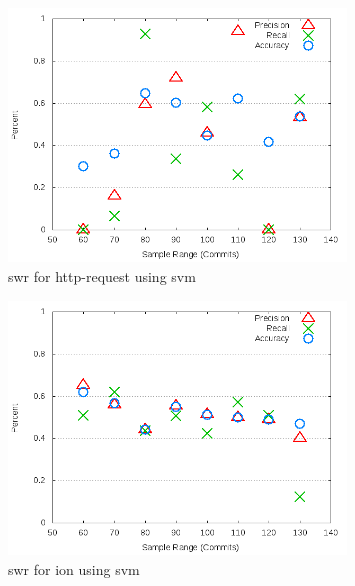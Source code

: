\begin{figure}[!t]
\centering
\includegraphics[width=0.8\textwidth]{images/svm/test_1/http-request_sample_range.png}
\caption{\gls{swr} for http-request using \gls{svm}}
\label{fig:test_1_http-request_svm}
\end{figure}

\clearpage
\begin{figure}[!t]
\centering
\includegraphics[width=0.8\textwidth]{images/svm/test_1/ion_sample_range.png}
\caption{\gls{swr} for ion using \gls{svm}}
\label{fig:test_1_ion_svm}
\end{figure}

